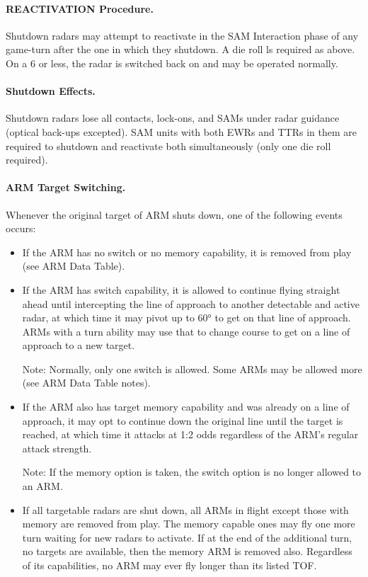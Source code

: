 \paragraph{REACTIVATION Procedure.} Shutdown radars may attempt to reactivate in the SAM Interaction phase of any game-turn after the one in which they shutdown. A die roll ls required as above. On a 6 or less, the radar is switched back on and may be operated normally.

\paragraph{Shutdown Effects.} Shutdown radars lose all contacts, lock-ons, and SAMs under radar guidance (optical back-ups excepted). SAM units with both EWRs and TTRs in them are required to shutdown and reactivate both simultaneously (only one die roll required).

\paragraph{ARM Target Switching.} Whenever the original target of ARM shuts down, one of the following events occurs:

\begin{itemize}

    \item If the ARM has no switch or no memory capability, it is removed from play (see ARM Data Table).

    \item If the ARM has switch capability, it is allowed to continue flying straight ahead until intercepting the line of approach to another detectable and active radar, at which time it may pivot up to 60° to get on that line of approach. ARMs with a turn ability may use that to change course to get on a line of approach to a new target.
    
    Note: Normally, only one switch is allowed.  Some ARMs may be allowed more (see ARM Data Table notes).

    \item If the ARM also has target memory capability and was already on a line of approach, it may opt to continue down the original line until the target is reached, at which time it attacks at 1:2 odds regardless of the ARM's regular attack strength.

    Note: If the memory option is taken, the switch option is no longer allowed to an ARM.

    \item If all targetable radars are shut down, all ARMs in flight except those with memory are removed from play. The memory capable ones may fly one more turn waiting for new radars to activate. If at the end of the additional turn, no targets are available, then the memory ARM is removed also. Regardless of its capabilities, no ARM may ever fly longer than its listed TOF.

\end{itemize}


